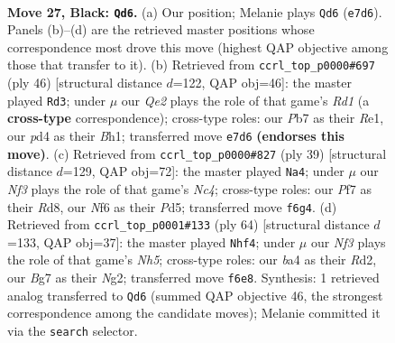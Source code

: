 \documentclass[11pt]{article}
\begin{document}
\clearpage

\begin{figure}[p]\centering
\begin{subfigure}{0.46\textwidth}\centering
\resizebox{\linewidth}{!}{%
\newchessgame
\chessboard[
  setfen={rnbr4/pp2qpbk/4pnp1/P2p2Bp/B2P3P/6P1/RPPNQP2/1N2R1K1 b - - 8 27},
  showmover=false,
  pgfstyle=straightmove, color=movearrow, markmove={e7-d6}
]}
\caption{}
\end{subfigure}\hfill
\begin{subfigure}{0.46\textwidth}\centering
\resizebox{\linewidth}{!}{%
\newchessgame
\chessboard[
  setfen={1n1r2k1/1pp1nrp1/p4b1p/2BPp3/4Ppq1/PN4Pb/1PQ1NP1P/3RR1KB w - - 1 24},
  showmover=false,
  pgfstyle=straightmove, color=movearrow, markmove={d1-d3}
]}
\caption{}
\end{subfigure}
\\[4pt]
\begin{subfigure}{0.46\textwidth}\centering
\resizebox{\linewidth}{!}{%
\newchessgame
\chessboard[
  setfen={1k1r3r/1p3pp1/pqb1p2p/2npP3/1P1Q1P1P/P1N4R/2P3P1/1K1R1B2 b - - 2 20},
  showmover=false,
  pgfstyle=straightmove, color=movearrow, markmove={c5-a4}
]}
\caption{}
\end{subfigure}\hfill
\begin{subfigure}{0.46\textwidth}\centering
\resizebox{\linewidth}{!}{%
\newchessgame
\chessboard[
  setfen={1b1r3k/pb3p2/1p1nppqr/3p3N/Q2P3P/P1R1PBP1/1P1R1PN1/6K1 w - - 1 33},
  showmover=false,
  pgfstyle=straightmove, color=movearrow, markmove={h5-f4}
]}
\caption{}
\end{subfigure}
\caption{\textbf{Move 27, Black: \texttt{Qd6}.} (a) Our position; Melanie plays \texttt{Qd6} (\texttt{e7d6}). Panels (b)--(d) are the retrieved master positions whose correspondence most drove this move (highest QAP objective among those that transfer to it). (b) Retrieved from \texttt{ccrl\_top\_p0000\#697} (ply 46) [structural distance $d$=122, QAP obj=46]: the master played \texttt{Rd3}; under $\mu$ our \emph{Qe2} plays the role of that game's \emph{Rd1} (a \textbf{cross-type} correspondence); cross-type roles: our \emph{P}b7 as their \emph{R}e1, our \emph{p}d4 as their \emph{B}h1; transferred move \texttt{e7d6} \textbf{(endorses this move)}. (c) Retrieved from \texttt{ccrl\_top\_p0000\#827} (ply 39) [structural distance $d$=129, QAP obj=72]: the master played \texttt{Na4}; under $\mu$ our \emph{Nf3} plays the role of that game's \emph{Nc4}; cross-type roles: our \emph{P}f7 as their \emph{R}d8, our \emph{N}f6 as their \emph{P}d5; transferred move \texttt{f6g4}. (d) Retrieved from \texttt{ccrl\_top\_p0001\#133} (ply 64) [structural distance $d$=133, QAP obj=37]: the master played \texttt{Nhf4}; under $\mu$ our \emph{Nf3} plays the role of that game's \emph{Nh5}; cross-type roles: our \emph{b}a4 as their \emph{R}d2, our \emph{B}g7 as their \emph{N}g2; transferred move \texttt{f6e8}. Synthesis: 1 retrieved analog transferred to \texttt{Qd6} (summed QAP objective 46, the strongest correspondence among the candidate moves); Melanie committed it via the \texttt{search} selector.}
\label{fig:thought-m53}
\end{figure}
\end{document}
